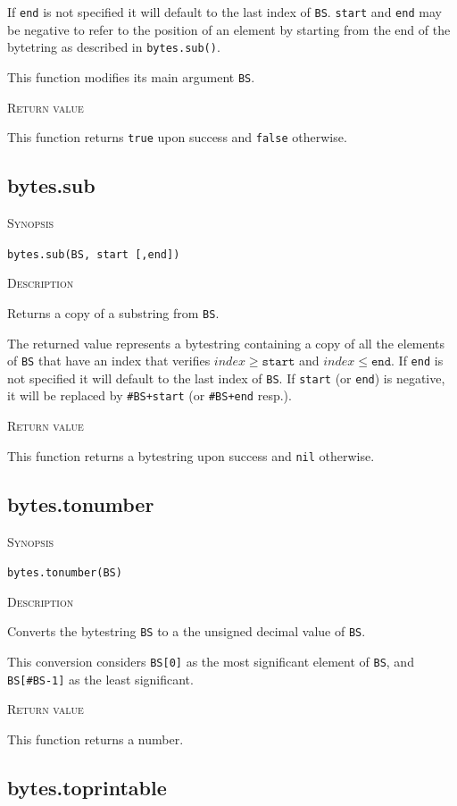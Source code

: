 \documentclass[11pt]{report}
\newcommand{\mansection}[1]{\vspace{0.5em}\par\noindent\textsc{#1}\vspace{0.5em}\par}
\newcommand{\syn}[1]{\texttt{#1}}
\begin{document}
  If \syn{end} is not specified it will default to the last index of \syn{BS}.
  \syn{start} and \syn{end} may be negative to refer to the position of an element by 
  starting from the end of the bytetring as described in \syn{bytes.sub()}.

  This function modifies its main argument \syn{BS}.
  
\mansection{Return value}
  This function returns \syn{true} upon success and \syn{false} otherwise.


\subsection{bytes.sub}

\mansection{Synopsis}
\syn{bytes.sub(BS, start [,end])}

\mansection{Description}
  Returns a copy of a substring from \syn{BS}.

  The returned value represents a bytestring containing a copy of all the 
  elements of \syn{BS} that have an index that verifies $index \geq \syn{start}$ and 
  $index \leq \syn{end}$.
  If \syn{end} is not specified it will default to the last index of \syn{BS}.
  If \syn{start} (or \syn{end}) is negative, it will be replaced by \syn{\#BS+start}
  (or \syn{\#BS+end} resp.).

\mansection{Return value}
  This function returns a bytestring upon success and \syn{nil} otherwise.


\subsection{bytes.tonumber}

\mansection{Synopsis}
\syn{bytes.tonumber(BS)}

\mansection{Description}
  Converts the bytestring \syn{BS} to a the unsigned decimal value of \syn{BS}.

  This conversion considers \syn{BS[0]} as the most significant element of \syn{BS}, 
  and \syn{BS[\#BS-1]} as the least significant. 
  
\mansection{Return value}
  This function returns a number.

\subsection{bytes.toprintable}
\end{document}
